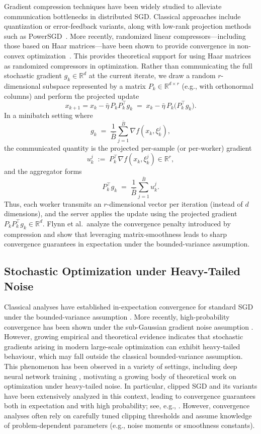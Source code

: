 \documentclass[10pt]{article}
\begin{document}
Gradient compression techniques have been widely studied to alleviate communication bottlenecks in distributed SGD.
Classical approaches include quantization or error-feedback variants, along with low-rank projection methods such as
PowerSGD~\cite{seide20141bit,karimireddy2019errorfeedback,vogels2019powersgd}. More recently, randomized linear compressors—including those based on Haar matrices—have been shown to provide convergence in non-convex optimization~\cite{flynn2024}. This provides theoretical support for using Haar matrices as randomized compressors in optimization.
Rather than communicating the full stochastic gradient $g_k\in\mathbb{R}^d$ at the current iterate,
we draw a random $r$-dimensional subspace represented by a matrix $P_k\in\mathbb{R}^{d\times r}$
(e.g., with orthonormal columns) and perform the projected update
\[
x_{k+1}=x_k-\bar{\eta}\,P_kP_k^\top g_k
      \;=\; x_k-\bar{\eta}\,P_k\bigl(P_k^\top g_k\bigr).
\]
In a minibatch setting where
\[
g_k \;=\; \frac{1}{\bar{B}}\sum_{j=1}^{\bar{B}} \nabla f(x_k,\xi_k^j),
\]
the communicated quantity is the projected per-sample (or per-worker) gradient
\[
u_k^j \;:=\; P_k^\top \nabla f(x_k,\xi_k^j)\in\mathbb{R}^r,
\]
and the aggregator forms
\[
P_k^\top g_k \;=\; \frac{1}{\bar{B}}\sum_{j=1}^{\bar{B}} u_k^j.
\]
Thus, each worker transmits an $r$-dimensional vector per iteration (instead of $d$ dimensions),
and the server applies the update using the projected gradient
$P_kP_k^\top g_k \in \mathbb{R}^d$.
Flynn et al.\ analyze the convergence penalty introduced by compression and show that leveraging
matrix-smoothness leads to sharp convergence guarantees in expectation under the
bounded-variance assumption.


\subsection{Stochastic Optimization under Heavy-Tailed Noise}
Classical analyses have established in-expectation convergence for standard SGD 
under the bounded-variance assumption \cite{ghadimi2013}. More recently, 
high-probability convergence has been shown under the sub-Gaussian 
gradient noise assumption \cite{liu2023hp}. However, growing empirical and theoretical evidence indicates that stochastic gradients arising in modern 
large-scale optimization can exhibit heavy-tailed behaviour, which may fall outside the classical bounded-variance assumption. 
This phenomenon has been observed in a variety of settings, including deep neural network training
\cite{simsekli2019,nguyen2019},
motivating a growing body of theoretical work on optimization under heavy-tailed noise.
In particular, clipped SGD and its variants have been extensively analyzed in this context, leading to convergence guarantees both in expectation and with high probability; see, e.g., \cite{zhang2020clipped,nguyen2023}.
However, convergence analyses often rely on carefully tuned clipping thresholds and assume knowledge of problem-dependent parameters (e.g., noise moments or smoothness constants).   
\end{document}
